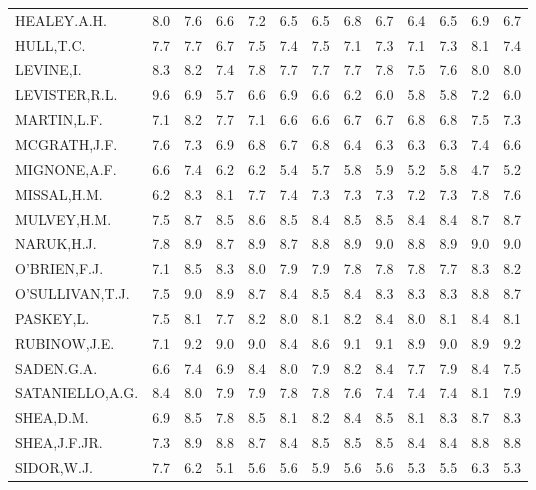 \documentclass[]{article}
\begin{document}
\begin{table}
\begin{tabular}[t]{lrrrrrrrrrrrr}
\rowcolor{gray!6}  HEALEY.A.H. & 8.0 & 7.6 & 6.6 & 7.2 & 6.5 & 6.5 & 6.8 & 6.7 & 6.4 & 6.5 & 6.9 & 6.7\\
HULL,T.C. & 7.7 & 7.7 & 6.7 & 7.5 & 7.4 & 7.5 & 7.1 & 7.3 & 7.1 & 7.3 & 8.1 & 7.4\\
\rowcolor{gray!6}  LEVINE,I. & 8.3 & 8.2 & 7.4 & 7.8 & 7.7 & 7.7 & 7.7 & 7.8 & 7.5 & 7.6 & 8.0 & 8.0\\
LEVISTER,R.L. & 9.6 & 6.9 & 5.7 & 6.6 & 6.9 & 6.6 & 6.2 & 6.0 & 5.8 & 5.8 & 7.2 & 6.0\\
\addlinespace
\rowcolor{gray!6}  MARTIN,L.F. & 7.1 & 8.2 & 7.7 & 7.1 & 6.6 & 6.6 & 6.7 & 6.7 & 6.8 & 6.8 & 7.5 & 7.3\\
MCGRATH,J.F. & 7.6 & 7.3 & 6.9 & 6.8 & 6.7 & 6.8 & 6.4 & 6.3 & 6.3 & 6.3 & 7.4 & 6.6\\
\rowcolor{gray!6}  MIGNONE,A.F. & 6.6 & 7.4 & 6.2 & 6.2 & 5.4 & 5.7 & 5.8 & 5.9 & 5.2 & 5.8 & 4.7 & 5.2\\
MISSAL,H.M. & 6.2 & 8.3 & 8.1 & 7.7 & 7.4 & 7.3 & 7.3 & 7.3 & 7.2 & 7.3 & 7.8 & 7.6\\
\rowcolor{gray!6}  MULVEY,H.M. & 7.5 & 8.7 & 8.5 & 8.6 & 8.5 & 8.4 & 8.5 & 8.5 & 8.4 & 8.4 & 8.7 & 8.7\\
\addlinespace
NARUK,H.J. & 7.8 & 8.9 & 8.7 & 8.9 & 8.7 & 8.8 & 8.9 & 9.0 & 8.8 & 8.9 & 9.0 & 9.0\\
\rowcolor{gray!6}  O'BRIEN,F.J. & 7.1 & 8.5 & 8.3 & 8.0 & 7.9 & 7.9 & 7.8 & 7.8 & 7.8 & 7.7 & 8.3 & 8.2\\
O'SULLIVAN,T.J. & 7.5 & 9.0 & 8.9 & 8.7 & 8.4 & 8.5 & 8.4 & 8.3 & 8.3 & 8.3 & 8.8 & 8.7\\
\rowcolor{gray!6}  PASKEY,L. & 7.5 & 8.1 & 7.7 & 8.2 & 8.0 & 8.1 & 8.2 & 8.4 & 8.0 & 8.1 & 8.4 & 8.1\\
RUBINOW,J.E. & 7.1 & 9.2 & 9.0 & 9.0 & 8.4 & 8.6 & 9.1 & 9.1 & 8.9 & 9.0 & 8.9 & 9.2\\
\addlinespace
\rowcolor{gray!6}  SADEN.G.A. & 6.6 & 7.4 & 6.9 & 8.4 & 8.0 & 7.9 & 8.2 & 8.4 & 7.7 & 7.9 & 8.4 & 7.5\\
SATANIELLO,A.G. & 8.4 & 8.0 & 7.9 & 7.9 & 7.8 & 7.8 & 7.6 & 7.4 & 7.4 & 7.4 & 8.1 & 7.9\\
\rowcolor{gray!6}  SHEA,D.M. & 6.9 & 8.5 & 7.8 & 8.5 & 8.1 & 8.2 & 8.4 & 8.5 & 8.1 & 8.3 & 8.7 & 8.3\\
SHEA,J.F.JR. & 7.3 & 8.9 & 8.8 & 8.7 & 8.4 & 8.5 & 8.5 & 8.5 & 8.4 & 8.4 & 8.8 & 8.8\\
\rowcolor{gray!6}  SIDOR,W.J. & 7.7 & 6.2 & 5.1 & 5.6 & 5.6 & 5.9 & 5.6 & 5.6 & 5.3 & 5.5 & 6.3 & 5.3\\

\end{tabular}
\end{table}
\end{document}
